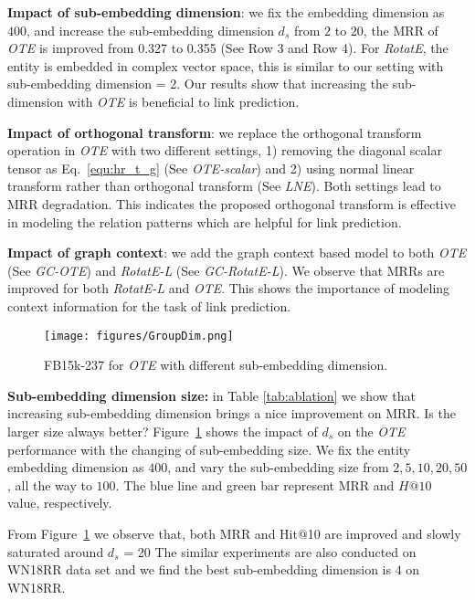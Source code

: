 \documentclass[11pt,a4paper]{article}
\begin{document}
\noindent\textbf{Impact of sub-embedding dimension}: we fix the embedding dimension as $400$, and increase the sub-embedding dimension $d_s$ from $2$ to $20$, the MRR of \textit{OTE} is improved from 0.327 to 0.355 (See Row 3 and Row 4).  For \textit{RotatE}, the entity is embedded in complex vector space, this is similar to our setting with sub-embedding dimension = 2. Our results show that increasing the sub-dimension with {\it OTE} is beneficial to link prediction. 


\noindent\textbf{Impact of orthogonal transform}: we replace the orthogonal transform operation in {\it OTE} with two different settings, 1) removing the diagonal scalar tensor as Eq.~\ref{equ:hr_t_g} (See \textit{OTE-scalar}) and 2) using normal linear transform rather than orthogonal transform (See \textit{LNE}). Both settings lead to MRR degradation. This indicates the proposed orthogonal transform is effective in modeling the relation patterns which are helpful for link prediction.
    
\noindent\textbf{Impact of graph context}: we add the graph context based model to both  {\it OTE} (See \textit{GC-OTE}) and {\it RotatE-L} (See \textit{GC-RotatE-L}). We observe that MRRs are improved for both {\it RotatE-L} and {\it OTE}. This shows the importance of modeling context information for the task of link prediction.








\begin{figure}[t!]
    \texttt{[image: figures/GroupDim.png]}
    \caption{FB15k-237 for {\it OTE} with different sub-embedding dimension.}
    \label{fig:groupdim}
\end{figure}

\noindent\textbf{Sub-embedding dimension size:} in Table \ref{tab:ablation} we show that increasing sub-embedding dimension brings a nice improvement on MRR. Is the larger size always better?
Figure~\ref{fig:groupdim} shows the impact of
$d_s$ on the {\it OTE} performance with the changing of sub-embedding size. We fix the entity embedding dimension as $400$, and vary the sub-embedding size from $2, 5, 10, 20, 50$, all the way to $100$. The blue line and green bar represent MRR and $H@10$ value, respectively. 

From Figure~\ref{fig:groupdim} we observe that, both MRR and Hit@10 are improved and slowly saturated around $d_s$ = 20
The similar experiments are also conducted on WN18RR data set and we find the best sub-embedding dimension is $4$ on WN18RR.
\end{document}
